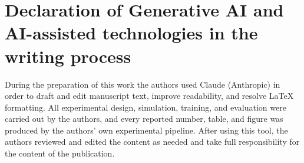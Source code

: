 \documentclass[3p,times,procedia]{elsarticle}
\begin{document}
\section*{Declaration of Generative AI and AI-assisted technologies in the writing process}

During the preparation of this work the authors used Claude (Anthropic) in order to draft and edit manuscript text, improve readability, and resolve LaTeX formatting. All experimental design, simulation, training, and evaluation were carried out by the authors, and every reported number, table, and figure was produced by the authors' own experimental pipeline. After using this tool, the authors reviewed and edited the content as needed and take full responsibility for the content of the publication.
\end{document}
